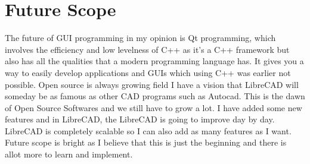\section{Future Scope}
The  future  of  GUI  programming  in  my  opinion is Qt programming,  which involves the efficiency and low
levelness  of  C++  as  it’s  a  C++  framework  but  also  has  all  the  qualities  that  a  modern  programming
language  has.  It  gives  you  a  way  to  easily  develop  applications  and  GUIs  which  using  C++  was earlier
not  possible.  Open  source  is  always  growing  field  I  have  a  vision  that  LibreCAD  will  someday  be  as
famous  as  other  CAD  programs   such  as  Autocad.  This  is  the  dawn of Open Source Softwares and we
still  have  to  grow  a  lot.  I  have  added some new  features and in  LibreCAD, the LibreCAD is going to improve day by day. LibreCAD is completely scalable so
I  can  also add as many features as I want. Future  scope  is  bright  as  I  believe  that  this  is  just  the
beginning and there is allot more to learn and implement.
